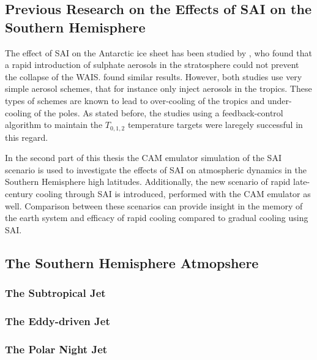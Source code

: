 \subsection{Previous Research on the Effects of SAI on the Southern Hemisphere}
The effect of SAI on the Antarctic ice sheet has been studied by \textcite{mccusker2015}, who found that a rapid introduction of sulphate aerosols in the stratosphere could not prevent the collapse of the WAIS. \textcite{sutter2023} found similar results. However, both studies use very simple aerosol schemes, that for instance only inject aerosols in the tropics. These types of schemes are known to lead to over-cooling of the tropics and under-cooling of the poles. As stated before, the studies using a feedback-control algorithm to maintain the $T_{0,1,2}$ temperature targets were laregely successful in this regard. 

In the second part of this thesis the CAM emulator simulation of the SAI scenario is used to investigate the effects of SAI on atmospheric dynamics in the Southern Hemisphere high latitudes. Additionally, the new scenario of rapid late-century cooling through SAI is introduced, performed with the CAM emulator as well. Comparison between these scenarios can provide insight in the memory of the earth system and efficacy of rapid cooling compared to gradual cooling using SAI. 


\subsection{The Southern Hemisphere Atmopshere}
\subsubsection{The Subtropical Jet}

\subsubsection{The Eddy-driven Jet}

\subsubsection{The Polar Night Jet}


